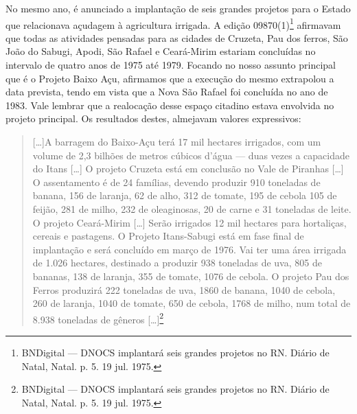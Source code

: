 \begin{refsection}
    No mesmo ano, é anunciado a implantação de seis grandes projetos para o Estado que relacionava açudagem à agricultura irrigada. A edição 09870(1)\footnote{BNDigital --- DNOCS implantará seis grandes projetos no RN. Diário de Natal, Natal. p. 5. 19 jul. 1975.} afirmavam que todas as atividades pensadas para as cidades de Cruzeta, Pau dos ferros, São João do Sabugi, Apodi, São Rafael e Ceará-Mirim estariam concluídas no intervalo de quatro anos de 1975 até 1979. Focando no nosso assunto principal que é o Projeto Baixo Açu, afirmamos que a execução do mesmo extrapolou a data prevista, tendo em vista que a Nova São Rafael foi concluída no ano de 1983. Vale lembrar que a realocação desse espaço citadino estava envolvida no projeto principal. Os resultados destes, almejavam valores expressivos:

    \begin{quotation}
        [\dots]A barragem do Baixo-Açu terá 17 mil hectares irrigados, com um volume de 2,3 bilhões de metros cúbicos d'água --- duas vezes a capacidade do Itans [\dots] O projeto Cruzeta está em conclusão no Vale de Piranhas [\dots] O assentamento é de 24 famílias, devendo produzir 910 toneladas de banana, 156 de laranja, 62 de alho, 312 de tomate, 195 de cebola 105 de feijão, 281 de milho, 232 de oleaginosas, 20 de carne e 31 toneladas de leite. O projeto Ceará-Mirim [\dots] Serão irrigados 12 mil hectares para hortaliças, cereais e pastagens. O Projeto Itans-Sabugi está em fase final de implantação e será concluído em março de 1976. Vai ter uma área irrigada de 1.026 hectares, destinado a produzir 938 toneladas de uva, 805 de bananas, 138 de laranja, 355 de tomate, 1076 de cebola. O projeto Pau dos Ferros produzirá 222 toneladas de uva, 1860 de banana, 1040 de cebola, 260 de laranja, 1040 de tomate, 650 de cebola, 1768 de milho, num total de 8.938 toneladas de gêneros [\dots]\footnote{BNDigital --- DNOCS implantará seis grandes projetos no RN. Diário de Natal, Natal. p. 5. 19 jul. 1975.}
    \end{quotation}


\end{refsection}
